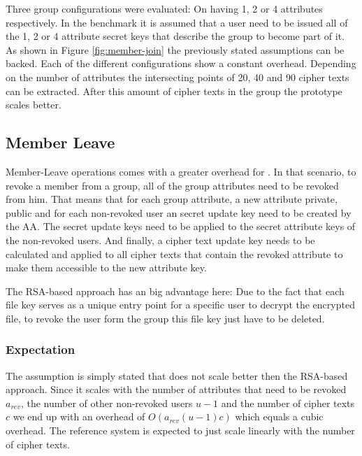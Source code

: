 Three group configurations were evaluated: On having 1, 2 or 4 attributes respectively. In the benchmark it is assumed that a user need to be issued all of the 1, 2 or 4 attribute secret keys that describe the group to become part of it. As shown in Figure \ref{fig:member-join} the previously stated assumptions can be backed. Each of the different \name configurations show a constant overhead. Depending on the number of attributes the intersecting points of 20, 40 and 90 cipher texts can be extracted. After this amount of cipher texts in the group the prototype scales better.

\subsection{Member Leave}
Member-Leave operations comes with a greater overhead for \name. In that scenario, to revoke a member from a group, all of the group attributes need to be revoked from him. That means that for each group attribute, a new attribute private, public and for each non-revoked user an secret update key need to be created by the AA. The secret update keys need to be applied to the secret attribute keys of the non-revoked users. And finally, a cipher text update key needs to be calculated and applied to all cipher texts that contain the revoked attribute to make them accessible to the new attribute key.

The RSA-based approach has an big advantage here: Due to the fact that each file key serves as a unique entry point for a specific user to decrypt the encrypted file, to revoke the user form the group this file key just have to be deleted. 

\subsubsection{Expectation}
The assumption is simply stated that \name does not scale better then the RSA-based approach. Since it scales with the number of attributes that need to be revoked $a_{rev}$, the number of other non-revoked users $u-1$ and the number of cipher texts $c$ we end up with an overhead of $O(a_{rev}(u-1)c)$ which equals a cubic overhead. The reference system is expected to just scale linearly with the number of cipher texts. 

